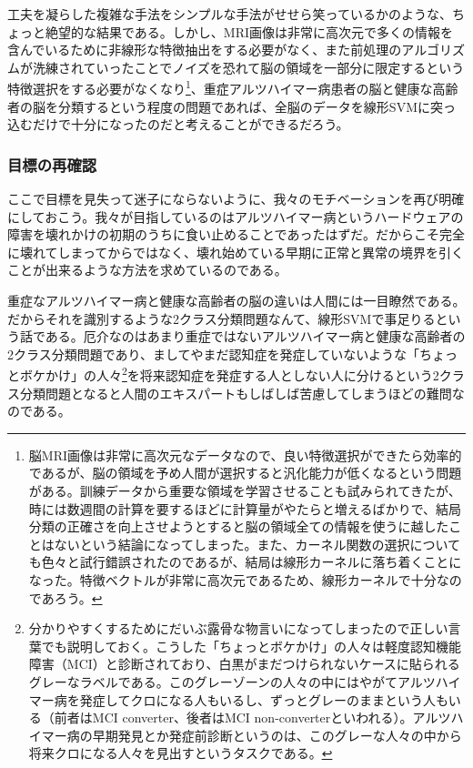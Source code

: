 工夫を凝らした複雑な手法をシンプルな手法がせせら笑っているかのような、ちょっと絶望的な結果である。しかし、MRI画像は非常に高次元で多くの情報を含んでいるために非線形な特徴抽出をする必要がなく、また前処理のアルゴリズムが洗練されていったことでノイズを恐れて脳の領域を一部分に限定するという特徴選択をする必要がなくなり\footnote{脳MRI画像は非常に高次元なデータなので、良い特徴選択ができたら効率的であるが、脳の領域を予め人間が選択すると汎化能力が低くなるという問題がある。訓練データから重要な領域を学習させることも試みられてきたが、時には数週間の計算を要するほどに計算量がやたらと増えるばかりで、結局分類の正確さを向上させようとすると脳の領域全ての情報を使うに越したことはないという結論になってしまった。また、カーネル関数の選択についても色々と試行錯誤されたのであるが、結局は線形カーネルに落ち着くことになった。特徴ベクトルが非常に高次元であるため、線形カーネルで十分なのであろう。}、重症アルツハイマー病患者の脳と健康な高齢者の脳を分類するという程度の問題であれば、全脳のデータを線形SVMに突っ込むだけで十分になったのだと考えることができるだろう。

\subsubsection{目標の再確認}
ここで目標を見失って迷子にならないように、我々のモチベーションを再び明確にしておこう。我々が目指しているのはアルツハイマー病というハードウェアの障害を壊れかけの初期のうちに食い止めることであったはずだ。だからこそ完全に壊れてしまってからではなく、壊れ始めている早期に正常と異常の境界を引くことが出来るような方法を求めているのである。

重症なアルツハイマー病と健康な高齢者の脳の違いは人間には一目瞭然である。だからそれを識別するような2クラス分類問題なんて、線形SVMで事足りるという話である。厄介なのはあまり重症ではないアルツハイマー病と健康な高齢者の2クラス分類問題であり、ましてやまだ認知症を発症していないような「ちょっとボケかけ」の人々\footnote{分かりやすくするためにだいぶ露骨な物言いになってしまったので正しい言葉でも説明しておく。こうした「ちょっとボケかけ」の人々は軽度認知機能障害（MCI）と診断されており、白黒がまだつけられないケースに貼られるグレーなラベルである。このグレーゾーンの人々の中にはやがてアルツハイマー病を発症してクロになる人もいるし、ずっとグレーのままという人もいる（前者はMCI converter、後者はMCI non-converterといわれる）。アルツハイマー病の早期発見とか発症前診断というのは、このグレーな人々の中から将来クロになる人々を見出すというタスクである。}を将来認知症を発症する人としない人に分けるという2クラス分類問題となると人間のエキスパートもしばしば苦慮してしまうほどの難問なのである。

